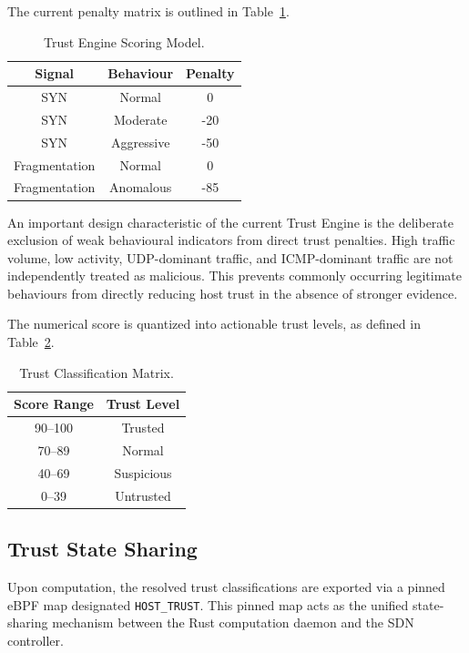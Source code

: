 \documentclass[conference]{IEEEtran}
\begin{document}
The current penalty matrix is outlined in Table~\ref{tab:scoring}.

\begin{table}[h]
\centering
\caption{Trust Engine Scoring Model.}
\label{tab:scoring}
\begin{tabular}{ccc}
\toprule
Signal & Behaviour & Penalty \\
\midrule
SYN & Normal & 0 \\
SYN & Moderate & -20 \\
SYN & Aggressive & -50 \\
Fragmentation & Normal & 0 \\
Fragmentation & Anomalous & -85 \\
\bottomrule
\end{tabular}
\end{table}

An important design characteristic of the current Trust Engine is the deliberate exclusion of weak behavioural indicators from direct trust penalties. High traffic volume, low activity, UDP-dominant traffic, and ICMP-dominant traffic are not independently treated as malicious. This prevents commonly occurring legitimate behaviours from directly reducing host trust in the absence of stronger evidence.

The numerical score is quantized into actionable trust levels, as defined in Table~\ref{tab:levels}.

\begin{table}[h]
\centering
\caption{Trust Classification Matrix.}
\label{tab:levels}
\begin{tabular}{cc}
\toprule
Score Range & Trust Level \\
\midrule
90--100 & Trusted \\
70--89 & Normal \\
40--69 & Suspicious \\
0--39 & Untrusted \\
\bottomrule
\end{tabular}
\end{table}

\subsection{Trust State Sharing}
Upon computation, the resolved trust classifications are exported via a pinned eBPF map designated \texttt{HOST\_TRUST}. This pinned map acts as the unified state-sharing mechanism between the Rust computation daemon and the SDN controller. 
\end{document}
